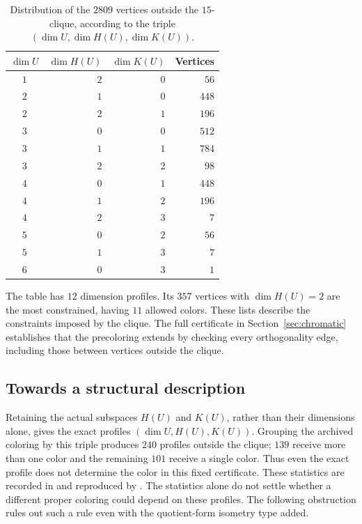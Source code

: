 \begin{table}[htbp]
\centering
\begin{tabular}{c|r|r|r}
\toprule
\(\dim U\) & \(\dim H(U)\) & \(\dim K(U)\) & Vertices \\
\midrule
\(1\) & \(2\) & \(0\) & \(56\) \\
\(2\) & \(1\) & \(0\) & \(448\) \\
\(2\) & \(2\) & \(1\) & \(196\) \\
\(3\) & \(0\) & \(0\) & \(512\) \\
\(3\) & \(1\) & \(1\) & \(784\) \\
\(3\) & \(2\) & \(2\) & \(98\) \\
\(4\) & \(0\) & \(1\) & \(448\) \\
\(4\) & \(1\) & \(2\) & \(196\) \\
\(4\) & \(2\) & \(3\) & \(7\) \\
\(5\) & \(0\) & \(2\) & \(56\) \\
\(5\) & \(1\) & \(3\) & \(7\) \\
\(6\) & \(0\) & \(3\) & \(1\) \\
\bottomrule
\end{tabular}
\caption{Distribution of the \(2809\) vertices outside the
\(15\)-clique, according to the triple
\((\dim U,\dim H(U),\dim K(U))\).}
\label{tab:profiles}
\end{table}

The table has \(12\) dimension profiles.  Its \(357\) vertices with
\(\dim H(U)=2\) are the most constrained, having \(11\) allowed colors.
These lists describe the constraints imposed by the clique.  The full
certificate in Section~\ref{sec:chromatic} establishes that the precoloring
extends by checking every orthogonality edge, including those between
vertices outside the clique.

\subsection{Towards a structural description}

Retaining the actual subspaces \(H(U)\) and \(K(U)\), rather than
their dimensions alone, gives the exact profiles
\((\dim U,H(U),K(U))\).  Grouping the archived coloring by this
triple produces \(240\) profiles outside the clique; \(139\) receive
more than one color and the remaining \(101\) receive a single color.
Thus even the exact profile does not determine the color in this
fixed certificate.  These statistics are recorded in
 and reproduced by
.  The statistics alone do not
settle whether a different proper coloring could depend on these
profiles.  The following obstruction rules out such a rule even
with the quotient-form isometry type added.

